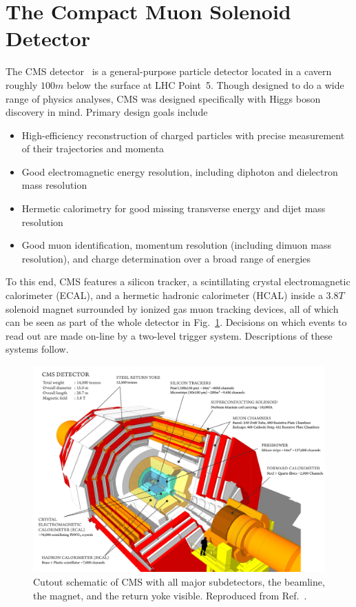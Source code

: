 \section{The Compact Muon Solenoid Detector}\label{sec:cms}
The CMS detector~\cite{Chatrchyan:2008zzk} is a general-purpose particle detector located in a cavern roughly $100\unit{m}$ below the surface at LHC Point~5.
Though designed to do a wide range of physics analyses, CMS was designed specifically with Higgs boson discovery in mind.
Primary design goals include
\begin{itemize}
  \item High-efficiency reconstruction of charged particles with precise measurement of their trajectories and momenta
  \item Good electromagnetic energy resolution, including diphoton and dielectron mass resolution
  \item Hermetic calorimetry for good missing transverse energy and dijet mass resolution
  \item Good muon identification, momentum resolution (including dimuon mass resolution), and charge determination over a broad range of energies
\end{itemize}
To this end, CMS features a silicon tracker, a scintillating crystal electromagnetic calorimeter (ECAL), and a hermetic hadronic calorimeter (HCAL) inside a $3.8\unit{T}$ solenoid magnet surrounded by ionized gas muon tracking devices, all of which can be seen as part of the whole detector in Fig.~\ref{fig:cmsWhole}.
Decisions on which events to read out are made on-line by a two-level trigger system.
Descriptions of these systems follow.

\begin{figure}[htbp]
  \centering
  \includegraphics[width=\textwidth]{experiment/cmsWhole.png}
  \caption[CMS cutout schematic]{
    Cutout schematic of CMS with all major subdetectors, the beamline, the magnet, and the return yoke visible. Reproduced from Ref.~\cite{Sakuma:1626816}.
  }\label{fig:cmsWhole}
\end{figure}

